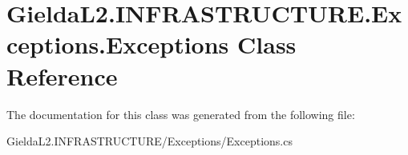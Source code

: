 \hypertarget{class_gielda_l2_1_1_i_n_f_r_a_s_t_r_u_c_t_u_r_e_1_1_exceptions_1_1_exceptions}{}\section{Gielda\+L2.\+I\+N\+F\+R\+A\+S\+T\+R\+U\+C\+T\+U\+R\+E.\+Exceptions.\+Exceptions Class Reference}
\label{class_gielda_l2_1_1_i_n_f_r_a_s_t_r_u_c_t_u_r_e_1_1_exceptions_1_1_exceptions}


The documentation for this class was generated from the following file\+:\begin{DoxyCompactItemize}
\item 
Gielda\+L2.\+I\+N\+F\+R\+A\+S\+T\+R\+U\+C\+T\+U\+R\+E/\+Exceptions/Exceptions.\+cs\end{DoxyCompactItemize}
